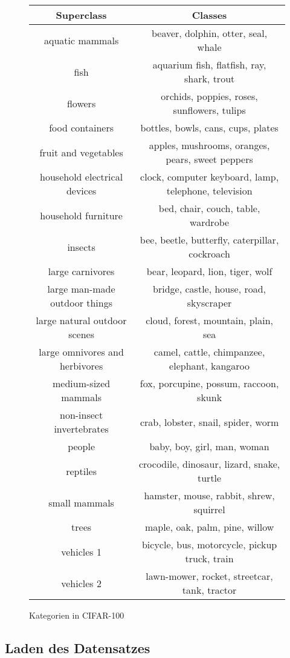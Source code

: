 \begin{figure}
  \begin{tabular} {c c} 
\hline
Superclass &	Classes\\
\hline
aquatic mammals & 	beaver, dolphin, otter, seal, whale\\
fish & 	aquarium fish, flatfish, ray, shark, trout\\
flowers & 	orchids, poppies, roses, sunflowers, tulips\\
food containers &	bottles, bowls, cans, cups, plates\\
fruit and vegetables &	apples, mushrooms, oranges, pears, sweet peppers\\
household electrical devices &	clock, computer keyboard, lamp, telephone, television\\
household furniture &	bed, chair, couch, table, wardrobe\\
insects &	bee, beetle, butterfly, caterpillar, cockroach\\
large carnivores &	bear, leopard, lion, tiger, wolf\\
large man-made outdoor things &	bridge, castle, house, road, skyscraper\\
large natural outdoor scenes &	cloud, forest, mountain, plain, sea\\
large omnivores and herbivores &	camel, cattle, chimpanzee, elephant, kangaroo\\
medium-sized mammals &	fox, porcupine, possum, raccoon, skunk\\
non-insect invertebrates &	crab, lobster, snail, spider, worm\\
people &	baby, boy, girl, man, woman\\
reptiles &	crocodile, dinosaur, lizard, snake, turtle\\
small mammals &	hamster, mouse, rabbit, shrew, squirrel\\
trees &	maple, oak, palm, pine, willow\\
vehicles 1 &	bicycle, bus, motorcycle, pickup truck, train\\
vehicles 2 &	lawn-mower, rocket, streetcar, tank, tractor\\
\end{tabular}
  \caption{Kategorien in CIFAR-100}
  \label{TabCIF100}

\end{figure}

\subsection{Laden des Datensatzes}

